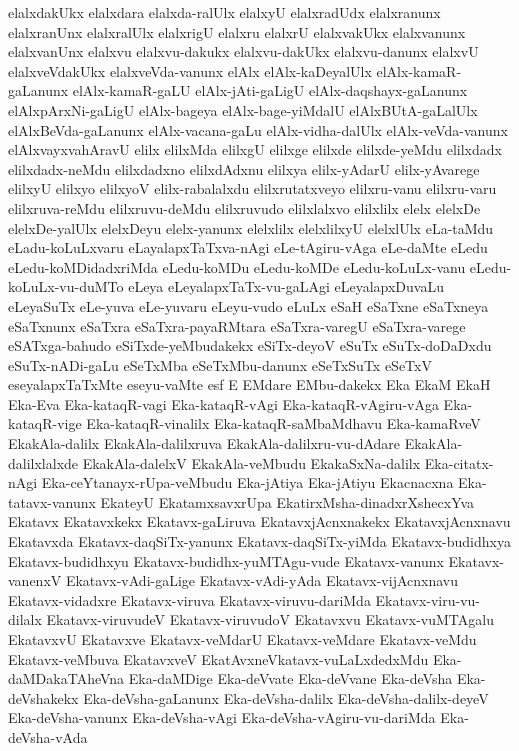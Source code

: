 {elalxdakUkx
elalxdara
elalxda-ralUlx
elalxyU
elalxradUdx
elalxranunx
elalxranUnx
elalxralUlx
elalxrigU
elalxru
elalxrU
elalxvakUkx
elalxvanunx
elalxvanUnx
elalxvu
elalxvu-dakukx
elalxvu-dakUkx
elalxvu-danunx
elalxvU
elalxveVdakUkx
elalxveVda-vanunx
elAlx
elAlx-kaDeyalUlx
elAlx-kamaR-gaLanunx
elAlx-kamaR-gaLU
elAlx-jAti-gaLigU
elAlx-daqshayx-gaLanunx
elAlxpArxNi-gaLigU
elAlx-bageya
elAlx-bage-yiMdalU
elAlxBUtA-gaLalUlx
elAlxBeVda-gaLanunx
elAlx-vacana-gaLu
elAlx-vidha-dalUlx
elAlx-veVda-vanunx
elAlxvayxvahAravU
elilx
elilxMda
elilxgU
elilxge
elilxde
elilxde-yeMdu
elilxdadx
elilxdadx-neMdu
elilxdadxno
elilxdAdxnu
elilxya
elilx-yAdarU
elilx-yAvarege
elilxyU
elilxyo
elilxyoV
elilx-rabalalxdu
elilxrutatxveyo
elilxru-vanu
elilxru-varu
elilxruva-reMdu
elilxruvu-deMdu
elilxruvudo
elilxlalxvo
elilxlilx
elelx
elelxDe
elelxDe-yalUlx
elelxDeyu
elelx-yanunx
elelxlilx
elelxlilxyU
elelxlUlx
eLa-taMdu
eLadu-koLuLxvaru
eLayalapxTaTxva-nAgi
eLe-tAgiru-vAga
eLe-daMte
eLedu
eLedu-koMDidadxriMda
eLedu-koMDu
eLedu-koMDe
eLedu-koLuLx-vanu
eLedu-koLuLx-vu-duMTo
eLeya
eLeyalapxTaTx-vu-gaLAgi
eLeyalapxDuvaLu
eLeyaSuTx
eLe-yuva
eLe-yuvaru
eLeyu-vudo
eLuLx
eSaH
eSaTxne
eSaTxneya
eSaTxnunx
eSaTxra
eSaTxra-payaRMtara
eSaTxra-varegU
eSaTxra-varege
eSATxga-bahudo
eSiTxde-yeMbudakekx
eSiTx-deyoV
eSuTx
eSuTx-doDaDxdu
eSuTx-nADi-gaLu
eSeTxMba
eSeTxMbu-danunx
eSeTxSuTx
eSeTxV
eseyalapxTaTxMte
eseyu-vaMte
esf
E
EMdare
EMbu-dakekx
Eka
EkaM
EkaH
Eka-Eva
Eka-kataqR-vagi
Eka-kataqR-vAgi
Eka-kataqR-vAgiru-vAga
Eka-kataqR-vige
Eka-kataqR-vinalilx
Eka-kataqR-saMbaMdhavu
Eka-kamaRveV
EkakAla-dalilx
EkakAla-dalilxruva
EkakAla-dalilxru-vu-dAdare
EkakAla-dalilxlalxde
EkakAla-dalelxV
EkakAla-veMbudu
EkakaSxNa-dalilx
Eka-citatx-nAgi
Eka-ceYtanayx-rUpa-veMbudu
Eka-jAtiya
Eka-jAtiyu
Ekacnacxna
Eka-tatavx-vanunx
EkateyU
EkatamxsavxrUpa
EkatirxMsha-dinadxrXshecxYva
Ekatavx
Ekatavxkekx
Ekatavx-gaLiruva
EkatavxjAcnxnakekx
EkatavxjAcnxnavu
Ekatavxda
Ekatavx-daqSiTx-yanunx
Ekatavx-daqSiTx-yiMda
Ekatavx-budidhxya
Ekatavx-budidhxyu
Ekatavx-budidhx-yuMTAgu-vude
Ekatavx-vanunx
Ekatavx-vanenxV
Ekatavx-vAdi-gaLige
Ekatavx-vAdi-yAda
Ekatavx-vijAcnxnavu
Ekatavx-vidadxre
Ekatavx-viruva
Ekatavx-viruvu-dariMda
Ekatavx-viru-vu-dilalx
Ekatavx-viruvudeV
Ekatavx-viruvudoV
Ekatavxvu
Ekatavx-vuMTAgalu
EkatavxvU
Ekatavxve
Ekatavx-veMdarU
Ekatavx-veMdare
Ekatavx-veMdu
Ekatavx-veMbuva
EkatavxveV
EkatAvxneVkatavx-vuLaLxdedxMdu
Eka-daMDakaTAheVna
Eka-daMDige
Eka-deVvate
Eka-deVvane
Eka-deVsha
Eka-deVshakekx
Eka-deVsha-gaLanunx
Eka-deVsha-dalilx
Eka-deVsha-dalilx-deyeV
Eka-deVsha-vanunx
Eka-deVsha-vAgi
Eka-deVsha-vAgiru-vu-dariMda
Eka-deVsha-vAda
}
